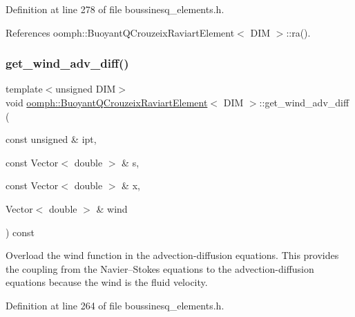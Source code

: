 Definition at line 278 of file boussinesq\+\_\+elements.\+h.



References oomph\+::\+Buoyant\+Q\+Crouzeix\+Raviart\+Element$<$ D\+I\+M $>$\+::ra().

\mbox{\label{classoomph_1_1BuoyantQCrouzeixRaviartElement_ade5820ae7c44a9371dcc348ca5a3ab1c}} 
\subsubsection{\texorpdfstring{get\+\_\+wind\+\_\+adv\+\_\+diff()}{get\_wind\_adv\_diff()}}
{\footnotesize\ttfamily template$<$unsigned D\+IM$>$ \\
void \hyperlink{classoomph_1_1BuoyantQCrouzeixRaviartElement}{oomph\+::\+Buoyant\+Q\+Crouzeix\+Raviart\+Element}$<$ D\+IM $>$\+::get\+\_\+wind\+\_\+adv\+\_\+diff (\begin{DoxyParamCaption}\item[{const unsigned \&}]{ipt,  }\item[{const Vector$<$ double $>$ \&}]{s,  }\item[{const Vector$<$ double $>$ \&}]{x,  }\item[{Vector$<$ double $>$ \&}]{wind }\end{DoxyParamCaption}) const\hspace{0.3cm}{\ttfamily [inline]}}



Overload the wind function in the advection-\/diffusion equations. This provides the coupling from the Navier--Stokes equations to the advection-\/diffusion equations because the wind is the fluid velocity. 



Definition at line 264 of file boussinesq\+\_\+elements.\+h.

\mbox{\label{classoomph_1_1BuoyantQCrouzeixRaviartElement_a5103e49416e1a0e36a2e8e117fb78623}} 
